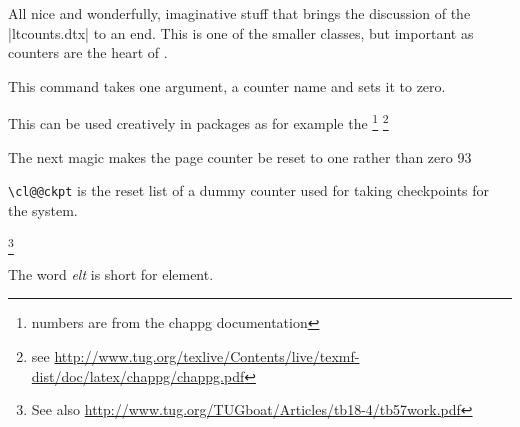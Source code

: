 All nice and wonderfully, imaginative stuff that brings the discussion of the |ltcounts.dtx| to an end. This is one of the smaller classes, but important as counters are the heart of \latex. 




This command takes one argument, a counter name and sets it to zero.

\begin{teXXX}
 \def\@stpelt#1{\global\csname c@#1\endcsname \z@}
\end{teXXX}


This can be used creatively in packages as for example the \footnote{numbers are from the chappg documentation} \footnote{see \url{http://www.tug.org/texlive/Contents/live/texmf-dist/doc/latex/chappg/chappg.pdf}}

\begin{teXXX}
The next magic makes the page counter be reset to one rather than zero
93 \renewcommand\@stpelt[1]{%
94 \global\csname c@#1\endcsname
95 \expandafter\ifx \csname c@#1\endcsname \c@page
96 \@ne
97 \else
98 \z@
99 \fi
100 }
\end{teXXX}



\texttt{\textbackslash cl@@ckpt}
 is the  reset list of a dummy counter 
used for taking checkpoints for the  system.


\makeatletter
\def\@elt{,   }



\topline

{\footnotesize 
\cl@@ckpt 
}

\bottomline


\begin{teXX}
 \def\cl@@ckpt{\@elt{page}}
\end{teXX}

\footnote{See also \url{http://www.tug.org/TUGboat/Articles/tb18-4/tb57work.pdf}}

The word \textit{elt} is short for element.


